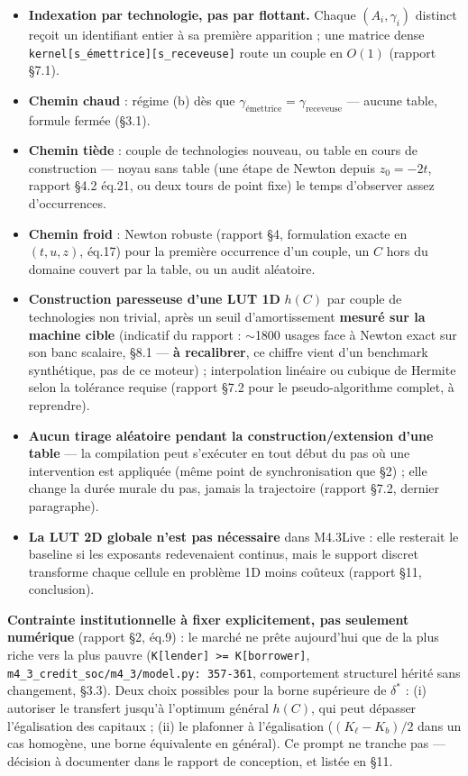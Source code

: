 \documentclass[11pt,a4paper]{article}
\newcommand{\code}[1]{\texttt{#1}}
\begin{document}
\begin{itemize}
\item \textbf{Indexation par technologie, pas par flottant.} Chaque
  $(A_i,\gamma_i)$ distinct reçoit un identifiant entier à sa première
  apparition ; une matrice dense
  \code{kernel[s\_émettrice][s\_receveuse]} route un couple en $O(1)$
  (rapport \S7.1).
\item \textbf{Chemin chaud} : régime (b) dès que
  $\gamma_{\text{émettrice}}=\gamma_{\text{receveuse}}$ --- aucune
  table, formule fermée (\S3.1).
\item \textbf{Chemin tiède} : couple de technologies nouveau, ou table
  en cours de construction --- noyau sans table (une étape de Newton
  depuis $z_0=-2t$, rapport \S4.2 éq.21, ou deux tours de point fixe) le
  temps d'observer assez d'occurrences.
\item \textbf{Chemin froid} : Newton robuste (rapport \S4, formulation
  exacte en $(t,u,z)$, éq.17) pour la première occurrence d'un couple, un
  $C$ hors du domaine couvert par la table, ou un audit aléatoire.
\item \textbf{Construction paresseuse d'une LUT 1D} $h(C)$ par couple de
  technologies non trivial, après un seuil d'amortissement \textbf{mesuré
  sur la machine cible} (indicatif du rapport : $\sim$1800 usages face à
  Newton exact sur son banc scalaire, \S8.1 --- \textbf{à recalibrer}, ce
  chiffre vient d'un benchmark synthétique, pas de ce moteur) ;
  interpolation linéaire ou cubique de Hermite selon la tolérance
  requise (rapport \S7.2 pour le pseudo-algorithme complet, à reprendre).
\item \textbf{Aucun tirage aléatoire pendant la construction/extension
  d'une table} --- la compilation peut s'exécuter en tout début du pas où
  une intervention est appliquée (même point de synchronisation que
  \S2) ; elle change la durée murale du pas, jamais la trajectoire
  (rapport \S7.2, dernier paragraphe).
\item \textbf{La LUT 2D globale n'est pas nécessaire} dans M4.3Live :
  elle resterait le baseline si les exposants redevenaient continus,
  mais le support discret transforme chaque cellule en problème 1D moins
  coûteux (rapport \S11, conclusion).
\end{itemize}

\textbf{Contrainte institutionnelle à fixer explicitement, pas seulement
numérique} (rapport \S2, éq.9) : le marché ne prête aujourd'hui que de
la plus riche vers la plus pauvre
(\code{K[lender] >= K[borrower]}, \code{m4\_3\_credit\_soc/m4\_3/model.py:
357-361}, comportement structurel hérité sans changement, \S3.3). Deux
choix possibles pour la borne supérieure de $\delta^{*}$ : (i) autoriser
le transfert jusqu'à l'optimum général $h(C)$, qui peut dépasser
l'égalisation des capitaux ; (ii) le plafonner à l'égalisation
($(K_\ell-K_b)/2$ dans un cas homogène, une borne équivalente en
général). Ce prompt ne tranche pas --- décision à documenter dans le
rapport de conception, et listée en \S11.
\end{document}
